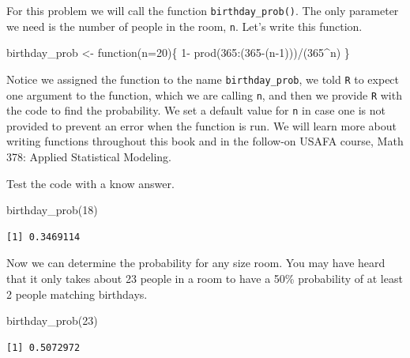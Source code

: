 \documentclass[
  letterpaper,
  DIV=11,
  numbers=noendperiod]{scrreprt}
\newenvironment{Shaded}{\begin{snugshade}}{\end{snugshade}}
\newcommand{\AttributeTok}[1]{\textcolor[rgb]{0.40,0.45,0.13}{#1}}
\newcommand{\ControlFlowTok}[1]{\textcolor[rgb]{0.00,0.23,0.31}{#1}}
\newcommand{\DecValTok}[1]{\textcolor[rgb]{0.68,0.00,0.00}{#1}}
\newcommand{\FunctionTok}[1]{\textcolor[rgb]{0.28,0.35,0.67}{#1}}
\newcommand{\NormalTok}[1]{\textcolor[rgb]{0.00,0.23,0.31}{#1}}
\newcommand{\OtherTok}[1]{\textcolor[rgb]{0.00,0.23,0.31}{#1}}
\newcommand{\SpecialCharTok}[1]{\textcolor[rgb]{0.37,0.37,0.37}{#1}}
\begin{document}
For this problem we will call the function \texttt{birthday\_prob()}.
The only parameter we need is the number of people in the room,
\texttt{n}. Let's write this function.

\begin{Shaded}
\begin{Highlighting}[]
\NormalTok{birthday\_prob }\OtherTok{\textless{}{-}} \ControlFlowTok{function}\NormalTok{(}\AttributeTok{n=}\DecValTok{20}\NormalTok{)\{}
  \DecValTok{1}\SpecialCharTok{{-}} \FunctionTok{prod}\NormalTok{(}\DecValTok{365}\SpecialCharTok{:}\NormalTok{(}\DecValTok{365}\SpecialCharTok{{-}}\NormalTok{(n}\DecValTok{{-}1}\NormalTok{)))}\SpecialCharTok{/}\NormalTok{(}\DecValTok{365}\SpecialCharTok{\^{}}\NormalTok{n)}
\NormalTok{\}}
\end{Highlighting}
\end{Shaded}

Notice we assigned the function to the name \texttt{birthday\_prob}, we
told \texttt{R} to expect one argument to the function, which we are
calling \texttt{n}, and then we provide \texttt{R} with the code to find
the probability. We set a default value for \texttt{n} in case one is
not provided to prevent an error when the function is run. We will learn
more about writing functions throughout this book and in the follow-on
USAFA course, Math 378: Applied Statistical Modeling.

Test the code with a know answer.

\begin{Shaded}
\begin{Highlighting}[]
\FunctionTok{birthday\_prob}\NormalTok{(}\DecValTok{18}\NormalTok{)}
\end{Highlighting}
\end{Shaded}

\begin{verbatim}
[1] 0.3469114
\end{verbatim}

Now we can determine the probability for any size room. You may have
heard that it only takes about 23 people in a room to have a 50\%
probability of at least 2 people matching birthdays.

\begin{Shaded}
\begin{Highlighting}[]
\FunctionTok{birthday\_prob}\NormalTok{(}\DecValTok{23}\NormalTok{)}
\end{Highlighting}
\end{Shaded}

\begin{verbatim}
[1] 0.5072972
\end{verbatim}
\end{document}
